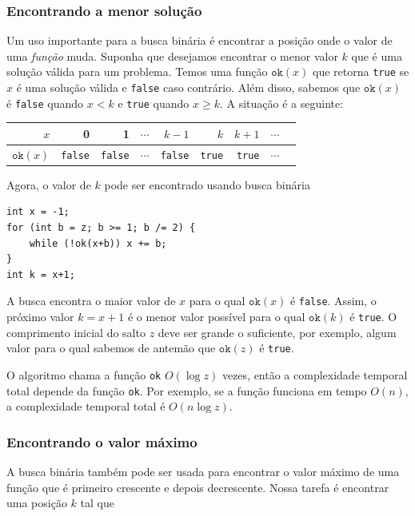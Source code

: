 \subsubsection{Encontrando a menor solução}

Um uso importante para a busca binária é encontrar a posição onde o valor de uma \emph{função} muda.
Suponha que desejamos encontrar o menor valor $k$
que é uma solução válida para um problema.
Temos uma função $\texttt{ok}(x)$
que retorna \texttt{true} se $x$ é uma solução válida
e \texttt{false} caso contrário.
Além disso, sabemos que $\texttt{ok}(x)$ é \texttt{false}
quando $x<k$ e \texttt{true} quando $x \ge k$.
A situação é a seguinte:

\begin{center}
\begin{tabular}{r|rrrrrrrr}
$x$ & 0 & 1 & $\cdots$ & $k-1$ & $k$ & $k+1$ & $\cdots$ \\
\hline
$\texttt{ok}(x)$ & \texttt{false} & \texttt{false}
& $\cdots$ & \texttt{false} & \texttt{true} & \texttt{true} & $\cdots$ \\
\end{tabular}
\end{center}

\noindent
Agora, o valor de $k$ pode ser encontrado usando busca binária

\begin{lstlisting}
int x = -1;
for (int b = z; b >= 1; b /= 2) {
    while (!ok(x+b)) x += b;
}
int k = x+1;
\end{lstlisting}

A busca encontra o maior valor de $x$ para o qual
$\texttt{ok}(x)$ é \texttt{false}.
Assim, o próximo valor $k=x+1$
é o menor valor possível para o qual
$\texttt{ok}(k)$ é \texttt{true}.
O comprimento inicial do salto $z$ deve ser grande o suficiente, por exemplo, algum valor para o qual sabemos de antemão que $\texttt{ok}(z)$ é \texttt{true}.

O algoritmo chama a função \texttt{ok}
$O(\log z)$ vezes, então a complexidade temporal total depende da função \texttt{ok}.
Por exemplo, se a função funciona em tempo $O(n)$,
a complexidade temporal total é $O(n \log z)$.

\subsubsection{Encontrando o valor máximo}

A busca binária também pode ser usada para encontrar o valor máximo de uma função que é primeiro crescente e depois decrescente.
Nossa tarefa é encontrar uma posição $k$ tal que

